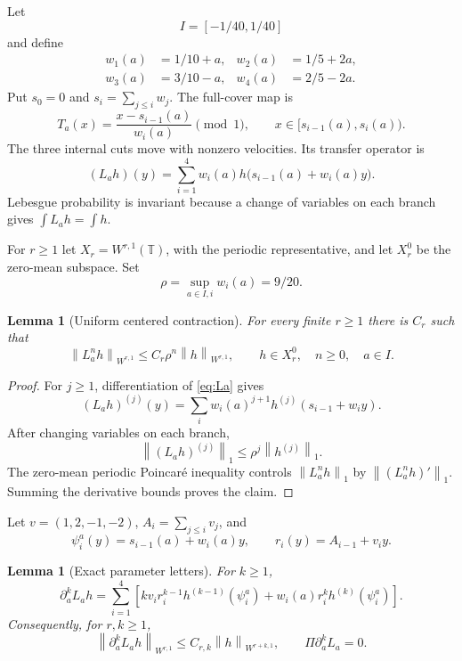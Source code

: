 \documentclass[11pt,reqno]{amsart}
\newtheorem{lemma}[theorem]{Lemma}
\theoremstyle{definition}
\theoremstyle{remark}
\newcommand{\T}{\mathbb T}
\newcommand{\Piop}{\Pi}
\newcommand{\norm}[1]{\left\lVert #1\right\rVert}
\begin{document}
Let
\[
 I=[-1/40,1/40]
\]
and define
\begin{align*}
 w_1(a)&=1/10+a,& w_2(a)&=1/5+2a,\\
 w_3(a)&=3/10-a,& w_4(a)&=2/5-2a.
\end{align*}
Put $s_0=0$ and $s_i=\sum_{j\le i}w_j$.  The full-cover map is
\begin{equation}\label{eq:Ta}
 T_a(x)=\frac{x-s_{i-1}(a)}{w_i(a)}\pmod1,
 \qquad x\in[s_{i-1}(a),s_i(a)).
\end{equation}
The three internal cuts move with nonzero velocities.  Its transfer operator is
\begin{equation}\label{eq:La}
 (L_ah)(y)=\sum_{i=1}^4 w_i(a)
 h\bigl(s_{i-1}(a)+w_i(a)y\bigr).
\end{equation}
Lebesgue probability is invariant because a change of variables on each
branch gives $\int L_ah=\int h$.

For $r\ge1$ let $X_r=W^{r,1}(\T)$, with the periodic representative, and let
$X_r^0$ be the zero-mean subspace.  Set
\[
 \rho=\sup_{a\in I,i}w_i(a)=9/20.
\]

\begin{lemma}[Uniform centered contraction]\label{lem:contract}
For every finite $r\ge1$ there is $C_r$ such that
\[
 \norm{L_a^nh}_{W^{r,1}}
 \le C_r\rho^n\norm{h}_{W^{r,1}},
 \qquad h\in X_r^0,\quad n\ge0,\quad a\in I.
\]
\end{lemma}

\begin{proof}
For $j\ge1$, differentiation of \eqref{eq:La} gives
\[
 (L_ah)^{(j)}(y)
 =\sum_i w_i(a)^{j+1}h^{(j)}(s_{i-1}+w_i y).
\]
After changing variables on each branch,
\[
 \norm{(L_ah)^{(j)}}_1
 \le\rho^j\norm{h^{(j)}}_1.
\]
The zero-mean periodic Poincar\'e inequality controls
$\norm{L_a^nh}_1$ by $\norm{(L_a^nh)'}_1$.  Summing the derivative bounds
proves the claim.
\end{proof}

Let $v=(1,2,-1,-2)$, $A_i=\sum_{j\le i}v_j$, and
\[
 \psi_i^a(y)=s_{i-1}(a)+w_i(a)y,
 \qquad r_i(y)=A_{i-1}+v_i y.
\]

\begin{lemma}[Exact parameter letters]\label{lem:letters}
For $k\ge1$,
\begin{equation}\label{eq:letters}
 \partial_a^kL_ah
 =\sum_{i=1}^4\left[
 k v_i r_i^{k-1}h^{(k-1)}(\psi_i^a)
 +w_i(a)r_i^kh^{(k)}(\psi_i^a)
 \right].
\end{equation}
Consequently, for $r,k\ge1$,
\[
 \norm{\partial_a^kL_ah}_{W^{r,1}}
 \le C_{r,k}\norm{h}_{W^{r+k,1}},
 \qquad
 \Piop\partial_a^kL_a=0.
\]
\end{lemma}
\end{document}
